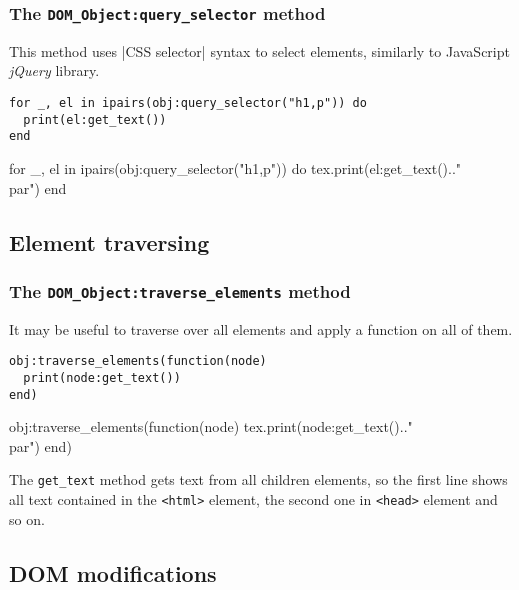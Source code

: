 \documentclass{ltxdoc}
\begin{document}
\subsubsection{The \texttt{DOM\_Object:query\_selector} method}

This method uses |CSS selector| syntax to select elements, similarly to JavaScript \textit{jQuery} library.

\begin{verbatim}
for _, el in ipairs(obj:query_selector("h1,p")) do
  print(el:get_text())
end
\end{verbatim}


\begin{framed}
  \begin{luacode*}
for _, el in ipairs(obj:query_selector("h1,p")) do
  tex.print(el:get_text().."\\par")
end
  \end{luacode*}
\end{framed}

\subsection{Element traversing}

\subsubsection{The \texttt{DOM\_Object:traverse\_elements} method}

It may be useful to traverse over all elements and apply a function on all of them. 

\begin{verbatim}
obj:traverse_elements(function(node)
  print(node:get_text())
end)
\end{verbatim}

\begin{framed}
  \begin{luacode*}
obj:traverse_elements(function(node)
  tex.print(node:get_text().."\\par")
end)
  \end{luacode*}
\end{framed}

The \verb|get_text| method gets text from all children elements, so the first
line shows all text contained in the \verb|<html>| element, the second one in
\verb|<head>| element and so on.  

\subsection{DOM modifications}
\end{document}
